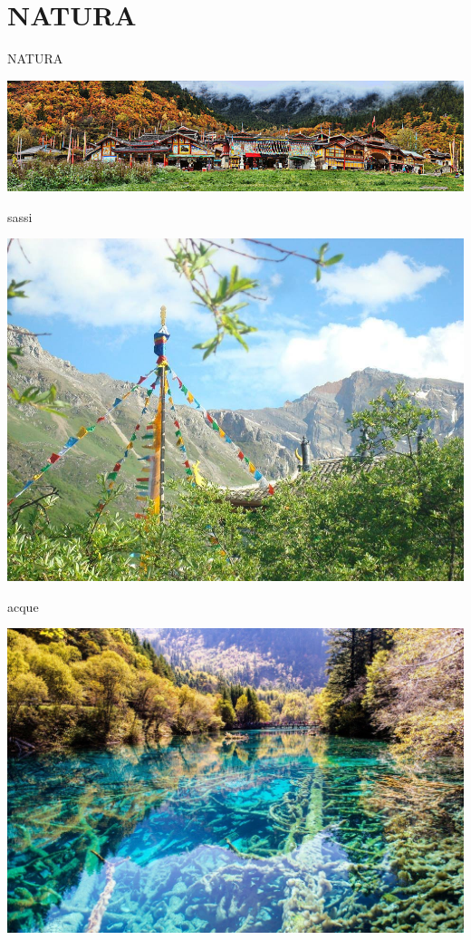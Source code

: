 \documentclass[presentation]{beamer}
\begin{document}
\section{NATURA}
\label{sec:org0419c74}
\begin{frame}[label={sec:org839d188}]{NATURA}
\begin{center}
\includegraphics[width=.9\linewidth]{./immagini/bosco.jpg}
\end{center}
\end{frame}
\begin{frame}[label={sec:org1d4a390}]{sassi}
\begin{center}
\includegraphics[width=.9\linewidth]{./immagini/montagna.jpg}
\end{center}
\end{frame}
\begin{frame}[label={sec:org881e0e5}]{acque}
\begin{center}
\includegraphics[width=.9\linewidth]{./immagini/lago.jpg}
\end{center}
\end{frame}
\end{document}
